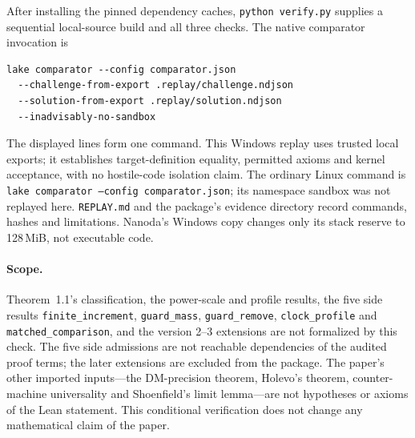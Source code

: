 After installing the pinned dependency caches, \texttt{python verify.py} supplies a sequential local-source build and all three checks. The native comparator invocation is
\begin{verbatim}
lake comparator --config comparator.json
  --challenge-from-export .replay/challenge.ndjson
  --solution-from-export .replay/solution.ndjson
  --inadvisably-no-sandbox
\end{verbatim}
The displayed lines form one command. This Windows replay uses trusted local exports; it establishes target-definition equality, permitted axioms and kernel acceptance, with no hostile-code isolation claim. The ordinary Linux command is \texttt{lake comparator --config comparator.json}; its namespace sandbox was not replayed here. \texttt{REPLAY.md} and the package's evidence directory record commands, hashes and limitations. Nanoda's Windows copy changes only its stack reserve to 128\,MiB, not executable code.

\paragraph{Scope.}
Theorem~1.1's classification, the power-scale and profile results, the five side results \texttt{finite\_increment}, \texttt{guard\_mass}, \texttt{guard\_remove}, \texttt{clock\_profile} and \texttt{matched\_comparison}, and the version 2--3 extensions are not formalized by this check. The five side admissions are not reachable dependencies of the audited proof terms; the later extensions are excluded from the package. The paper's other imported inputs---the DM-precision theorem, Holevo's theorem, counter-machine universality and Shoenfield's limit lemma---are not hypotheses or axioms of the Lean statement. This conditional verification does not change any mathematical claim of the paper.
